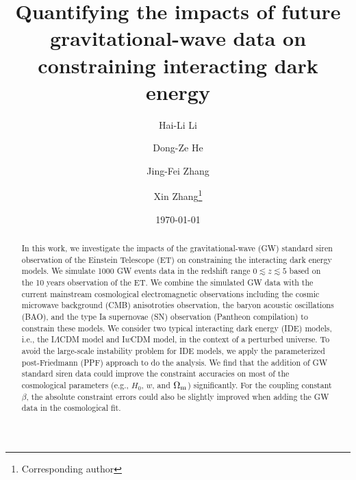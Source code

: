 \documentclass[aps,prd,nofootinbib,amsmath,amssymb,superscriptaddress,twocolumn,10pt]{revtex4}%
\newcommand{\red}{\textcolor[rgb]{1.00,0.00,0.00}}
\begin{document}
\title{Quantifying the impacts of future gravitational-wave data on constraining interacting dark energy}

\author{Hai-Li Li}
\author{Dong-Ze He}
\author{Jing-Fei Zhang}

\author{Xin Zhang\footnote{Corresponding author}}
\date{\today}

\begin{abstract}
In this work, we investigate the impacts of the gravitational-wave (GW) standard siren observation of the Einstein Telescope (ET) on constraining the interacting dark energy models. We simulate 1000 GW events data in the redshift range  $0\lesssim z \lesssim 5$ based on the 10 years observation of the ET. We combine the simulated GW data with the current mainstream cosmological electromagnetic observations including the cosmic microwave background (CMB) anisotroties observation, the baryon acoustic oscillations (BAO), and the type Ia supernovae (SN) observation (Pantheon compilation) to constrain these models. We consider two typical interacting dark energy (IDE) models, i.e., the I$\Lambda$CDM model and I$w$CDM model, in the context of a perturbed universe. To avoid the large-scale instability problem for IDE models, we apply the parameterized post-Friedmann (PPF) approach to do the analysis. We find that the addition of GW standard siren data could improve the constraint accuracies on most of the cosmological parameters (e.g., $H_{0}$, $w$, and $\Omega_{\rm m}$) significantly. \red{For the coupling constant $\beta$, the absolute constraint errors could also be slightly improved when adding the GW data in the cosmological fit}.

\end{abstract}
\maketitle
\end{document}
